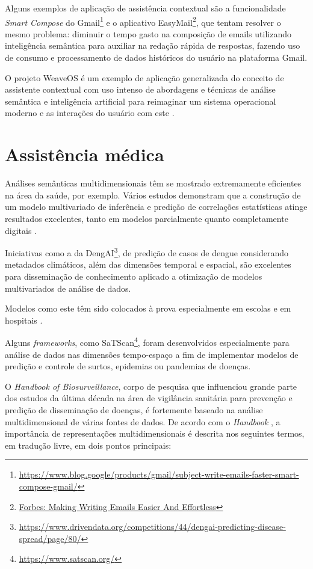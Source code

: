 Alguns exemplos de aplicação de assistência contextual são a funcionalidade \textit{Smart Compose} do Gmail\footnote{\url{https://www.blog.google/products/gmail/subject-write-emails-faster-smart-compose-gmail/}} e o aplicativo EasyMail\footnote{\href{https://www.forbes.com/sites/frederickdaso/2018/02/28/this-mit-and-harvard-startup-is-making-writing-e-mails-easier-and-effortless}{Forbes: Making Writing Emails Easier And Effortless}}, que tentam resolver o mesmo problema: diminuir o tempo gasto na composição de emails utilizando inteligência semântica para auxiliar na redação rápida de respostas, fazendo uso de consumo e processamento de dados históricos do usuário na plataforma Gmail.

O projeto WeaveOS é um exemplo de aplicação generalizada do conceito de assistente contextual com uso intenso de abordagens e técnicas de análise semântica e inteligência artificial para reimaginar um sistema operacional moderno e as interações do usuário com este \cite{bura2016ai}.

\section{Assistência médica}

Análises semânticas multidimensionais têm se mostrado extremamente eficientes na área da saúde, por exemplo. Vários estudos demonstram que a construção de um modelo multivariado de inferência e predição de correlações estatísticas atinge resultados excelentes, tanto em modelos parcialmente \cite{ziemann2015syndromic} quanto completamente digitais \cite{mann2011alert}.

Iniciativas como a da DengAI\footnote{\url{https://www.drivendata.org/competitions/44/dengai-predicting-disease-spread/page/80/}}, de predição de casos de dengue considerando metadados climáticos, além das dimensões temporal e espacial, são excelentes para disseminação de conhecimento aplicado a otimização de modelos multivariados de análise de dados.

Modelos como este têm sido colocados à prova especialmente em escolas \cite{buehler2008syndromic} e em hospitais \cite{aghaizueurope}.

Alguns \textit{frameworks}, como SaTScan\footnote{\url{https://www.satscan.org/}}, foram desenvolvidos especialmente para análise de dados nas dimensões tempo-espaço a fim de implementar modelos de predição e controle de surtos, epidemias ou pandemias de doenças.

O \textit{Handbook of Biosurveillance}, corpo de pesquisa que influenciou grande parte dos estudos da última década na área de vigilância sanitária para prevenção e predição de disseminação de doenças, é fortemente baseado na análise multidimensional de várias fontes de dados. De acordo com o \textit{Handbook} \cite{wagner2011handbook}, a importância de representações multidimensionais é descrita nos seguintes termos, em tradução livre, em dois pontos principais:

